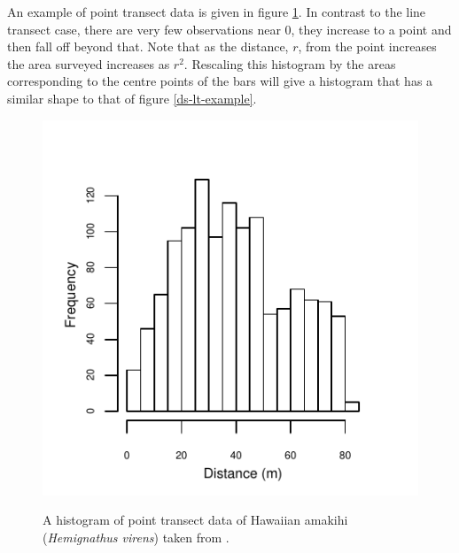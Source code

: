 An example of point transect data is given in figure \ref{ds-pt-example}. In contrast to the line transect case, there are very few observations near 0, they increase to a point and then fall off beyond that. Note that as the distance, $r$, from the point increases the area surveyed increases as $r^2$. Rescaling this histogram by the areas corresponding to the centre points of the bars will give a histogram that has a similar shape to that of figure \ref{ds-lt-example}.

\begin{figure}
\centering
\includegraphics{intro/figs/pt-data-example.pdf}\\
\caption{A histogram of point transect data of Hawaiian amakihi (\textit{Hemignathus virens}) taken from \cite{amakihi}.}
\label{ds-pt-example}
\end{figure}



